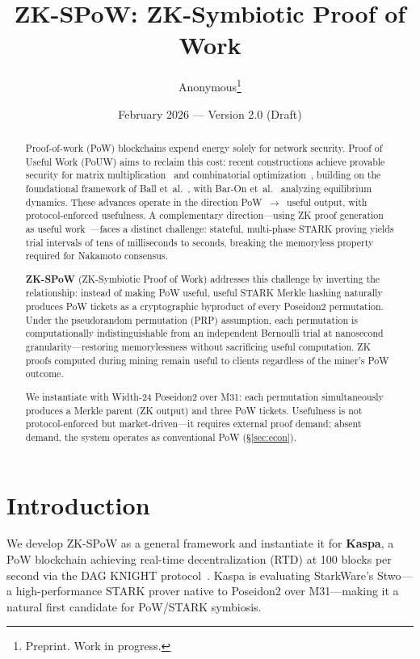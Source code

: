 \documentclass[11pt,a4paper]{article}
\title{\textbf{ZK-SPoW: ZK-Symbiotic Proof of Work}}
\author{Anonymous\thanks{Preprint. Work in progress.}}
\date{February 2026 --- Version 2.0 (Draft)}
\begin{document}
\maketitle

\begin{abstract}
Proof-of-work (PoW) blockchains expend energy solely for network security. Proof of Useful Work (PoUW) aims to reclaim this cost: recent constructions achieve provable security for matrix multiplication~\cite{komargodski2025} and combinatorial optimization~\cite{ofelimos}, building on the foundational framework of Ball et~al.~\cite{ball2017}, with Bar-On et~al.~\cite{baron2025} analyzing equilibrium dynamics. These advances operate in the direction PoW~$\to$~useful output, with protocol-enforced usefulness. A complementary direction---using ZK proof generation as useful work~\cite{oleksak2025}---faces a distinct challenge: stateful, multi-phase STARK proving yields trial intervals of tens of milliseconds to seconds, breaking the memoryless property required for Nakamoto consensus.

\textbf{ZK-SPoW} (ZK-Symbiotic Proof of Work) addresses this challenge by inverting the relationship: instead of making PoW useful, useful STARK Merkle hashing naturally produces PoW tickets as a cryptographic byproduct of every Poseidon2 permutation. Under the pseudorandom permutation (PRP) assumption, each permutation is computationally indistinguishable from an independent Bernoulli trial at nanosecond granularity---restoring memorylessness without sacrificing useful computation. ZK proofs computed during mining remain useful to clients regardless of the miner's PoW outcome.

We instantiate with Width-24 Poseidon2 over M31: each permutation simultaneously produces a Merkle parent (ZK output) and three PoW tickets. Usefulness is not protocol-enforced but market-driven---it requires external proof demand; absent demand, the system operates as conventional PoW (\S\ref{sec:econ}).
\end{abstract}

\section{Introduction}
\label{sec:intro}

We develop ZK-SPoW as a general framework and instantiate it for \textbf{Kaspa}, a PoW blockchain achieving real-time decentralization (RTD) at 100 blocks per second via the DAG KNIGHT protocol~\cite{dagknight}. Kaspa is evaluating StarkWare's Stwo---a high-performance STARK prover native to Poseidon2 over M31---making it a natural first candidate for PoW/STARK symbiosis.
\end{document}
